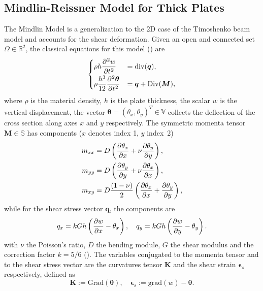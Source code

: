 \documentclass{ifacconf}
\begin{document}
\subsection{Mindlin-Reissner Model for Thick Plates}
\label{subsec:classMin}
The Mindlin Model is a generalization to the 2D case of the Timoshenko beam model and accounts for the shear deformation. Given an open and connected set $\Omega \in \mathbb{R}^2$, the classical equations for this model (\cite{mindlin}) are 
\begin{equation}
\begin{cases}
\displaystyle \rho h \diffp[2]{w}{t} &= \mathrm{div}(\bm{q}),  \vspace{1mm}\\
\displaystyle \rho\frac{h^3}{12} \diffp[2]{\bm \theta}{t} &= \bm{q} + \mathrm{Div}(\bm M), \\
\end{cases}
\end{equation}
where $\rho$ is the material density, $h$ is the plate thickness, the scalar $w$ is the vertical displacement, the vector $\bm \theta = (\theta_x, \theta_y)^T \in \mathbb{V}$ collects the deflection of the cross section along axes $x$ and $y$ respectively. The symmetric momenta tensor $\bm{M} \in \mathbb{S}$  has components ($x$ denotes index 1, $y$ index~2)
\begin{equation*}
\begin{aligned}
m_{xx} &= D\left(\diffp{\theta_x}{x} + \nu \diffp{\theta_y}{y}\right),\\
m_{yy} &= D\left(\diffp{\theta_y}{y} + \nu \diffp{\theta_x}{x}\right),\\
m_{xy} &= D \frac{(1 - \nu)}{2} \left(\diffp{\theta_x}{x} + \diffp{\theta_y}{y}\right), \\
\end{aligned}
\end{equation*}
while for the shear stress vector $\bm{q}$, the components are 
\begin{equation*}
q_{x} = k G h \left(\diffp{w}{x} - \theta_x \right), \quad q_{y} = k G h \left(\diffp{w}{y} - \theta_y \right). 
\end{equation*}
with $\nu$ the Poisson's ratio, $D$ the bending module, $G$ the shear modulus and the correction factor $k = 5/6$  (\cite{mindlin}). The variables conjugated to the momenta tensor and to the shear stress vector are the curvatures tensor $\bm{K}$ and the shear strain $\bm{\epsilon}_s$ respectively, defined as
\begin{equation*}
\bm{K} := \mathrm{Grad}(\bm{\theta}), \quad \bm{\epsilon}_s := \mathrm{grad}(w) - \bm{\theta}.
\end{equation*}
\end{document}
